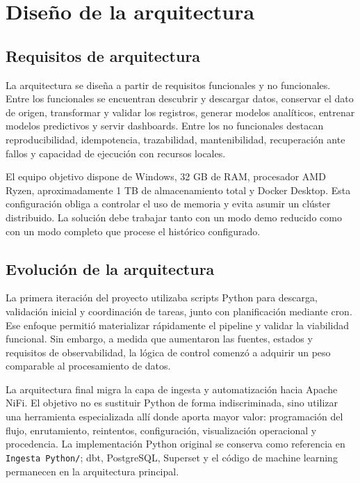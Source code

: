 \chapter{Diseño de la arquitectura}\label{chap:arquitectura}

\section{Requisitos de arquitectura}

La arquitectura se diseña a partir de requisitos funcionales y no funcionales. Entre los funcionales se encuentran descubrir y descargar datos, conservar el dato de origen, transformar y validar los registros, generar modelos analíticos, entrenar modelos predictivos y servir dashboards. Entre los no funcionales destacan reproducibilidad, idempotencia, trazabilidad, mantenibilidad, recuperación ante fallos y capacidad de ejecución con recursos locales.

El equipo objetivo dispone de Windows, 32 GB de RAM, procesador AMD Ryzen, aproximadamente 1 TB de almacenamiento total y Docker Desktop. Esta configuración obliga a controlar el uso de memoria y evita asumir un clúster distribuido. La solución debe trabajar tanto con un modo demo reducido como con un modo completo que procese el histórico configurado.

\section{Evolución de la arquitectura}

La primera iteración del proyecto utilizaba scripts Python para descarga, validación inicial y coordinación de tareas, junto con planificación mediante cron. Ese enfoque permitió materializar rápidamente el pipeline y validar la viabilidad funcional. Sin embargo, a medida que aumentaron las fuentes, estados y requisitos de observabilidad, la lógica de control comenzó a adquirir un peso comparable al procesamiento de datos.

La arquitectura final migra la capa de ingesta y automatización hacia Apache NiFi. El objetivo no es sustituir Python de forma indiscriminada, sino utilizar una herramienta especializada allí donde aporta mayor valor: programación del flujo, enrutamiento, reintentos, configuración, visualización operacional y procedencia. La implementación Python original se conserva como referencia en \texttt{Ingesta Python/}; dbt, PostgreSQL, Superset y el código de machine learning permanecen en la arquitectura principal.

